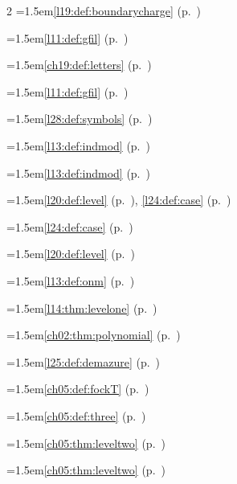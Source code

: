 \begin{multicols}{2}
\hangindent=1.5em\quad \ref{l19:def:boundarycharge} (p.~\pageref{l19:def:boundarycharge})\par
\hangindent=1.5em\quad \ref{l11:def:gfil} (p.~\pageref{l11:def:gfil})\par
\hangindent=1.5em\quad \ref{ch19:def:letters} (p.~\pageref{ch19:def:letters})\par
\hangindent=1.5em\quad \ref{l11:def:gfil} (p.~\pageref{l11:def:gfil})\par
\hangindent=1.5em\quad \ref{l28:def:symbols} (p.~\pageref{l28:def:symbols})\par
\hangindent=1.5em\quad \ref{l13:def:indmod} (p.~\pageref{l13:def:indmod})\par
\hangindent=1.5em\quad \ref{l13:def:indmod} (p.~\pageref{l13:def:indmod})\par
\hangindent=1.5em\quad \ref{l20:def:level} (p.~\pageref{l20:def:level}), \ref{l24:def:case} (p.~\pageref{l24:def:case})\par
\hangindent=1.5em\quad \ref{l24:def:case} (p.~\pageref{l24:def:case})\par
\hangindent=1.5em\quad \ref{l20:def:level} (p.~\pageref{l20:def:level})\par
\hangindent=1.5em\quad \ref{l13:def:onm} (p.~\pageref{l13:def:onm})\par
\hangindent=1.5em\quad \ref{l14:thm:levelone} (p.~\pageref{l14:thm:levelone})\par
\hangindent=1.5em\quad \ref{ch02:thm:polynomial} (p.~\pageref{ch02:thm:polynomial})\par
\hangindent=1.5em\quad \ref{l25:def:demazure} (p.~\pageref{l25:def:demazure})\par
\hangindent=1.5em\quad \ref{ch05:def:fockT} (p.~\pageref{ch05:def:fockT})\par
\hangindent=1.5em\quad \ref{ch05:def:three} (p.~\pageref{ch05:def:three})\par
\hangindent=1.5em\quad \ref{ch05:thm:leveltwo} (p.~\pageref{ch05:thm:leveltwo})\par
\hangindent=1.5em\quad \ref{ch05:thm:leveltwo} (p.~\pageref{ch05:thm:leveltwo})\par

\end{multicols}
